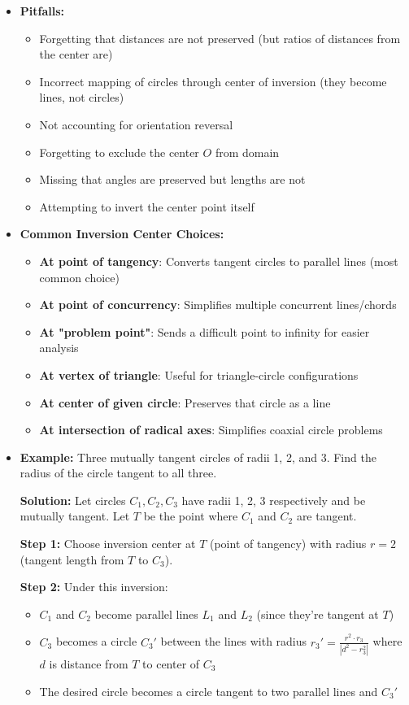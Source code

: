 \documentclass[12pt]{article}
\begin{document}
\begin{itemize}
    \item \textbf{Pitfalls:} 
    \begin{itemize}
        \item Forgetting that distances are not preserved (but ratios of distances from the center are)
        \item Incorrect mapping of circles through center of inversion (they become lines, not circles)
        \item Not accounting for orientation reversal
        \item Forgetting to exclude the center $O$ from domain
        \item Missing that angles are preserved but lengths are not
        \item Attempting to invert the center point itself
    \end{itemize}
    
    \item \textbf{Common Inversion Center Choices:}
    \begin{itemize}
        \item \textbf{At point of tangency}: Converts tangent circles to parallel lines (most common choice)
        \item \textbf{At point of concurrency}: Simplifies multiple concurrent lines/chords
        \item \textbf{At "problem point"}: Sends a difficult point to infinity for easier analysis
        \item \textbf{At vertex of triangle}: Useful for triangle-circle configurations
        \item \textbf{At center of given circle}: Preserves that circle as a line
        \item \textbf{At intersection of radical axes}: Simplifies coaxial circle problems
    \end{itemize}
    
    \item \textbf{Example:} Three mutually tangent circles of radii 1, 2, and 3. Find the radius of the circle tangent to all three.
    
    \textbf{Solution:} Let circles $C_1, C_2, C_3$ have radii 1, 2, 3 respectively and be mutually tangent. Let $T$ be the point where $C_1$ and $C_2$ are tangent.
    
    \textbf{Step 1:} Choose inversion center at $T$ (point of tangency) with radius $r = 2$ (tangent length from $T$ to $C_3$).
    
    \textbf{Step 2:} Under this inversion:
    \begin{itemize}
        \item $C_1$ and $C_2$ become parallel lines $L_1$ and $L_2$ (since they're tangent at $T$)
        \item $C_3$ becomes a circle $C_3'$ between the lines with radius $r_3' = \frac{r^2 \cdot r_3}{|d^2 - r_3^2|}$ where $d$ is distance from $T$ to center of $C_3$
        \item The desired circle becomes a circle tangent to two parallel lines and $C_3'$
    \end{itemize}
    

\end{itemize}
\end{document}
